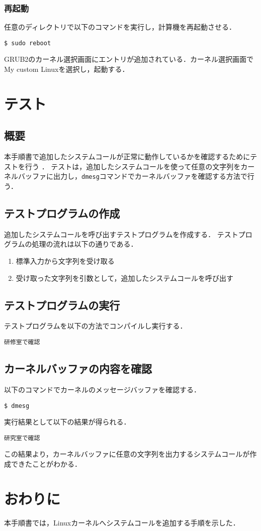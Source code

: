 \documentclass[12pt]{jsarticle}
\begin{document}
\subsubsection{再起動}
任意のディレクトリで以下のコマンドを実行し，計算機を再起動させる．
\begin{verbatim}
$ sudo reboot
\end{verbatim}
GRUB2のカーネル選択画面にエントリが追加されている．カーネル選択画面でMy custom Linuxを選択し，起動する．

\section{テスト}
\subsection{概要}
本手順書で追加したシステムコールが正常に動作しているかを確認するためにテストを行う
．
テストは，追加したシステムコールを使って任意の文字列をカーネルバッファに出力し，\verb|dmesg|コマンドでカーネルバッファを確認する方法で行う．

\subsection{テストプログラムの作成}
追加したシステムコールを呼び出すテストプログラムを作成する．
テストプログラムの処理の流れは以下の通りである．
\begin{enumerate}
\item 標準入力から文字列を受け取る
\item 受け取った文字列を引数として，追加したシステムコールを呼び出す 
\end{enumerate}
\subsection{テストプログラムの実行}
テストプログラムを以下の方法でコンパイルし実行する．
\begin{verbatim}
研修室で確認
\end{verbatim}
\subsection{カーネルバッファの内容を確認}
以下のコマンドでカーネルのメッセージバッファを確認する．
\begin{verbatim}
$ dmesg
\end{verbatim}
実行結果として以下の結果が得られる．
\begin{verbatim}
研究室で確認
\end{verbatim}
この結果より，カーネルバッファに任意の文字列を出力するシステムコールが作成できたことがわかる．
\section{おわりに}
本手順書では，Linuxカーネルへシステムコールを追加する手順を示した．
\end{document}
